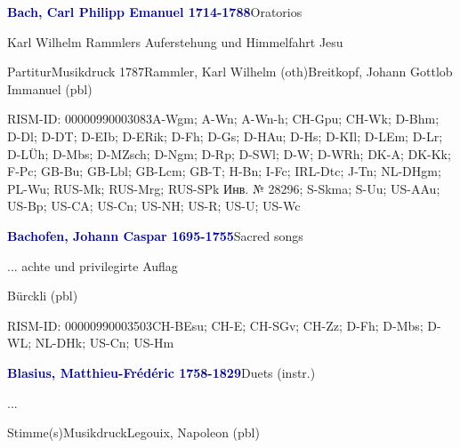 \documentclass[twocolumn]{book}
\begin{document}
\par \vspace{7pt} \textcolor{darkblue}{\textbf{Bach, Carl Philipp Emanuel  1714-1788}}\hfillplus{\textbf{[241]}}\newline Oratorios
\par \begin{itshape}Karl Wilhelm Rammlers Auferstehung und Himmelfahrt Jesu\end{itshape} 
\par \textcolor{darkblue}{}  Partitur\newline Musikdruck  1787\newline Rammler, Karl Wilhelm  (oth)\newline Breitkopf, Johann Gottlob Immanuel  (pbl)
\par RISM-ID: 00000990003083\newline A-Wgm; A-Wn; A-Wn-h; CH-Gpu; CH-Wk; D-Bhm; D-Dl; D-DT; D-EIb; D-ERik; D-Fh; D-Gs; D-HAu; D-Hs; D-KIl; D-LEm; D-Lr; D-LÜh; D-Mbs; D-MZsch; D-Ngm; D-Rp; D-SWl; D-W; D-WRh; DK-A; DK-Kk; F-Pc; GB-Bu; GB-Lbl; GB-Lcm; GB-T; H-Bn; I-Fc; IRL-Dtc; J-Tn; NL-DHgm; PL-Wu; RUS-Mk; RUS-Mrg; RUS-SPk  Инв. № 28296; S-Skma; S-Uu; US-AAu; US-Bp; US-CA; US-Cn; US-NH; US-R; US-U; US-Wc
\par \vspace{7pt} \textcolor{darkblue}{\textbf{Bachofen, Johann Caspar  1695-1755}}\hfillplus{\textbf{[242]}}\newline Sacred songs
\par \begin{itshape}... achte und privilegirte Auflag\end{itshape} \newline Bürckli  (pbl)
\par RISM-ID: 00000990003503\newline CH-BEsu; CH-E; CH-SGv; CH-Zz; D-Fh; D-Mbs; D-WL; NL-DHk; US-Cn; US-Hm
\par \vspace{7pt} \textcolor{darkblue}{\textbf{Blasius, Matthieu-Frédéric  1758-1829}}\hfillplus{\textbf{[243]}}\newline Duets (instr.)
\par \begin{itshape}...\end{itshape} 
\par \textcolor{darkblue}{}  Stimme(s)\newline Musikdruck\newline Legouix, Napoleon  (pbl)
\end{document}
